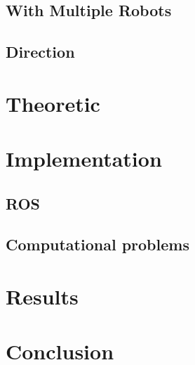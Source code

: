\documentclass[12pt]{report} %
\begin{document}
\section{With Multiple Robots}

\section{Direction}


\chapter{Theoretic}

\chapter{Implementation}
\section{ROS}

\section{Computational problems}

\chapter{Results}\label{ch:results}

\chapter*{Conclusion}
%


\nocite{*}




\end{document}
